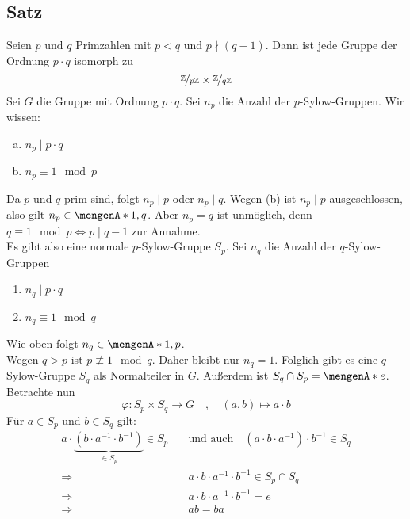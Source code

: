 \subsection[Satz: Isomorphie einer Gruppe der Ordnung $p \cdot q$, $p,q$ prim]{Satz} %
\label{sub:47}
Seien $p$ und $q$ Primzahlen mit $p < q$ und $p \nmid (q-1)$. Dann ist jede Gruppe der Ordnung $p \cdot q$ isomorph zu 
\[
	\nicefrac{\mathds{Z}}{p \mathds{Z}} \times \nicefrac{\mathds{Z}}{q \mathds{Z}}
\]
Sei $G$ die Gruppe mit Ordnung $p \cdot q$. Sei $n_p$ die Anzahl der $p$-Sylow-Gruppen. Wir wissen:
\begin{multicols}{2}
	\begin{enumerate}[(a)]
		\item $n_p \mid p \cdot q$ 
		\item $n_p \equiv 1 \mod p$
	\end{enumerate}
\end{multicols}
Da $p$ und $q$ prim sind, folgt $n_p \mid p$ oder $n_p \mid q$. Wegen (b) ist $n_p \mid p$ ausgeschlossen, also gilt $n_p \in \set{1,q} $. Aber $n_p =q$ ist unmöglich, denn
$q \equiv 1 \mod p \Leftrightarrow p \mid q-1$ \light zur Annahme. \\
Es gibt also eine normale $p$-Sylow-Gruppe $S_p$. Sei $n_q$ die Anzahl der $q$-Sylow-Gruppen
\begin{multicols}{2}
	\begin{enumerate}[(a')]
		\item $n_q \mid p \cdot q$
		\item $n_q \equiv 1 \mod q$
	\end{enumerate}
\end{multicols}
Wie oben folgt $n_q \in \set{1,p} $. \\
Wegen $q > p$ ist $p \not\equiv 1 \mod q$. Daher bleibt nur $n_q = 1$. Folglich gibt es eine $q$-Sylow-Gruppe $S_q$ als Normalteiler in $G$. Außerdem ist 
$S_q \cap S_p = \set{e}$. Betrachte nun 
\[
	\varphi : S_p \times S_q \to G \quad , \quad (a,b) \mapsto a \cdot b
\]
Für $a \in S_p$ und $b \in S_q$ gilt:
\begin{align*}
	a \cdot \underbrace{(b \cdot a ^{-1} \cdot b ^{-1})}_{\in S_p} \in S_p \quad &\text{und auch} \quad  (a \cdot b \cdot a ^{-1}) \cdot b ^{-1} \in S_q  \\
	\Rightarrow & a \cdot b \cdot a ^{-1} \cdot b ^{-1} \in S_p \cap S_q \\
	\Rightarrow & a \cdot b \cdot a ^{-1} \cdot b ^{-1} = e \\
	\Rightarrow  &ab=ba
\end{align*}

